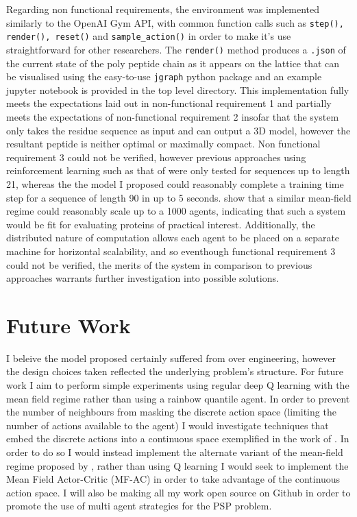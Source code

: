 Regarding non functional requirements, the environment was implemented similarly
to the OpenAI Gym API, with common function calls such as \texttt{step(), render(),
reset()} and \texttt{sample\_action()} in order to make it's use straightforward
for other researchers. The \texttt{render()} method produces a \texttt{.json} 
of the current state of the poly peptide chain as it appears on the lattice 
that can be visualised using the easy-to-use \texttt{jgraph} python package and
an example jupyter notebook is provided in the top level directory. This implementation
fully meets the expectations laid out in non-functional requirement 1 and partially
meets the expectations of non-functional requirement 2 insofar that the system
only takes the residue sequence as input and can output a 3D model, however
the resultant peptide is neither optimal or maximally compact. Non functional
requirement 3 could not be verified, however previous approaches using reinforcement learning
such as that of \cite{Wu2019} were only tested for sequences up to length 21, whereas
the the model I proposed could reasonably complete a training time step for a sequence
of length 90 in up to 5 seconds. \cite{Mguni2018} show that a similar mean-field 
regime could reasonably scale up to a 1000 agents, indicating that such a system
would be fit for evaluating proteins of practical interest. Additionally,
the distributed nature of computation allows each agent to be placed on a separate 
machine for horizontal scalability, and so eventhough functional requirement 3 could 
not be verified, the merits of the system in comparison to previous approaches
warrants further investigation into possible solutions.

\section{Future Work}
I beleive the model proposed certainly suffered from over engineering, however
the design choices taken reflected the underlying problem's structure. For future 
work I aim to perform simple experiments using regular deep Q learning with the 
mean field regime rather than using a rainbow quantile agent. In order to prevent
the number of neighbours from masking the discrete action space (limiting the number
of actions available to the agent) I would investigate techniques that embed the discrete
actions into a continuous space exemplified in the work of \cite{Gabriel2015}. In order
to do so I would instead implement the alternate variant of the mean-field regime
proposed by \cite{Yang2018}, rather than using Q learning I would seek to implement
the Mean Field Actor-Critic (MF-AC) in order to take advantage of the continuous 
action space. I will also be making all my work open source on Github in order
to promote the use of multi agent strategies for the PSP problem.


